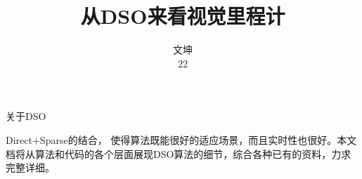 \documentclass[UTF8]{book}
\title{\textbf{从DSO来看视觉里程计}}
\author{文坤\\22}
\date{} %
\begin{document}
\maketitle %

\Large{\centerline{关于DSO}}
\quad \par
    Direct+Sparse的结合， 使得算法既能很好的适应场景，而且实时性也很好。本文档将从算法和代码的各个层面展现DSO算法的细节，综合各种已有的资料，力求完整详细。\\
\thispagestyle{empty} %

\tableofcontents
\thispagestyle{empty}

\mainmatter




   



\end{document}
